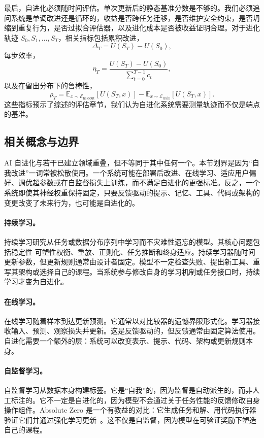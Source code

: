 最后，自进化必须随时间评估。单次更新后的静态基准分数是不够的。我们必须追问系统是单调改进还是循环的，收益是否跨任务迁移，是否维护安全约束，是否坍缩到重复行为，是否过拟合评估器，以及进化成本是否被收益证明合理。对于进化轨迹 $S_0,S_1,\ldots,S_T$，相关指标包括累积改进，
\begin{equation}
\Delta_T = U(S_T)-U(S_0),
\end{equation}
每步效率，
\begin{equation}
\eta_T = \frac{U(S_T)-U(S_0)}{\sum_{t=0}^{T-1} c_t},
\end{equation}
以及在留出分布下的鲁棒性，
\begin{equation}
\rho_T = \mathbb{E}_{x\sim\mathcal{E}_{\mathrm{heldout}}}[U(S_T,x)] - \mathbb{E}_{x\sim\mathcal{E}_{\mathrm{train}}}[U(S_T,x)].
\end{equation}
这些指标预示了综述的评估章节，我们认为自进化系统需要测量轨迹而不仅是端点的基准。

\subsection{相关概念与边界}\label{sec:intro-related}

AI 自进化与若干已建立领域重叠，但不等同于其中任何一个。本节划界是因为``自我改进''一词常被松散使用。一个系统可能在部署后改进、在线学习、适应用户偏好、调优超参数或在自监督损失上训练，而不满足自进化的更强标准。反之，一个系统即使其神经权重保持固定，只要反馈驱动的提示、记忆、工具、代码或架构的变更改变了未来行为，也可能是自进化的。

\paragraph{持续学习。} 持续学习研究从任务或数据分布序列中学习而不灾难性遗忘的模型。其核心问题包括稳定性-可塑性权衡、重放、正则化、任务推断和终身适应。持续学习器随时间更新参数，但更新规则通常由设计者固定。模型不一定检查失败、提出新工具、重写其架构或选择自己的课程。当系统参与修改自身的学习机制或任务接口时，持续学习才变为自进化。

\paragraph{在线学习。} 在线学习随着样本到达更新预测。它通常以对比较器的遗憾界限形式化。学习器接收输入、预测、观察损失并更新。这是反馈驱动的，但反馈通常由固定算法使用。自进化需要一个额外的层：系统可以改变表示、提示、代码、架构或更新规则本身。

\paragraph{自监督学习。} 自监督学习从数据本身构建标签。它是``自我''的，因为监督是自动派生的，而非人工标注的。它不一定是自进化的，因为模型不会通过关于任务性能的反馈修改自身操作组件。Absolute Zero 是一个有教益的对比：它生成任务和解、用代码执行器验证它们并通过强化学习更新~\citep{absolutezero2025}。这不仅是自监督，因为模型在可验证奖励下塑造自己的课程。

